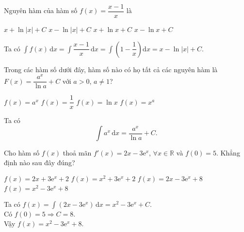 \documentclass[12pt,aspectratio=169]{beamer}
\begin{document}
\begin{tracnghiem}%
	Nguyên hàm của hàm số $f(x)=\dfrac{x-1}{x}$ là

	\choice
		{$x+\ln|x|+C$}
		{\True $x-\ln|x|+C$}
		{$x+\ln x+C$}
		{$x-\ln x+C$}

	\begin{loigiai}
			Ta có $\displaystyle\int f(x) \mathrm{\,d}x=\int\dfrac{x-1}{x} \mathrm{\,d}x=\int\left(1-\dfrac{1}{x}\right)\mathrm{d}x=x-\ln|x|+C$.
	\end{loigiai}
\end{tracnghiem}

\begin{tracnghiem}%
	Trong các hàm số dưới đây, hàm số nào có họ tất cả các nguyên hàm là $F(x)=\dfrac{a^x}{\ln a}+C$ với $a>0$, $a\ne 1$?

	\choice
		{\True $f(x)=a^x$}
		{$f(x)=\dfrac{1}
		{x}$}
		{$f(x)=\ln x$}
		{$f(x)=x^a$}

	\begin{loigiai}
			Ta có \[\displaystyle\int a^x\mathrm{\,d}x=\dfrac{a^x}{\ln a}+C.\]
	\end{loigiai}
\end{tracnghiem}

\begin{tracnghiem}%
	Cho hàm số $f(x)$ thoả mãn $f'(x)=2x-3\mathrm{e}^x$, $\forall x \in \mathbb{R}$ và $f(0)=5$. Khẳng định nào sau đây đúng?

	\choice
		{$f(x)=2x+3\mathrm{e}^x+2$}
		{$f(x)=x^2+3\mathrm{e}^x+2$}
		{$f(x)=2x-3\mathrm{e}^x+8$}
		{\True $f(x)=x^2-3\mathrm{e}^x+8$}

	\begin{loigiai}
			Ta có $f(x)=\displaystyle\int \left(2x-3\mathrm{e}^x\right) \mathrm{\,d}x=x^2-3\mathrm{e}^x+C$.\\
			Có $f(0)=5\Rightarrow C=8$. \\
			Vậy $f(x)=x^2-3\mathrm{e}^x+8$.
	\end{loigiai}
\end{tracnghiem}
\end{document}
